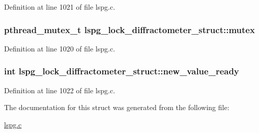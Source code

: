 Definition at line 1021 of file lspg.\-c.

\hypertarget{structlspg__lock__diffractometer__struct_a362e848dfd1551428b8d12d8776fd2ed}{
\subsubsection[{mutex}]{\setlength{\rightskip}{0pt plus 5cm}pthread\-\_\-mutex\-\_\-t lspg\-\_\-lock\-\_\-diffractometer\-\_\-struct\-::mutex}}\label{structlspg__lock__diffractometer__struct_a362e848dfd1551428b8d12d8776fd2ed}


Definition at line 1020 of file lspg.\-c.

\hypertarget{structlspg__lock__diffractometer__struct_ae94acdf44008ce48930e3083f08f5b6c}{
\subsubsection[{new\-\_\-value\-\_\-ready}]{\setlength{\rightskip}{0pt plus 5cm}int lspg\-\_\-lock\-\_\-diffractometer\-\_\-struct\-::new\-\_\-value\-\_\-ready}}\label{structlspg__lock__diffractometer__struct_ae94acdf44008ce48930e3083f08f5b6c}


Definition at line 1022 of file lspg.\-c.



The documentation for this struct was generated from the following file\-:\begin{DoxyCompactItemize}
\item 
\hyperlink{lspg_8c}{lspg.\-c}\end{DoxyCompactItemize}
